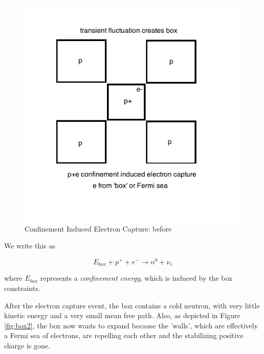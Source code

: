 \documentclass[%
 aip,
 jmp,%
 amsmath,amssymb,
 reprint,%
]{revtex4-1}
\begin{document}
\begin{figure}
   \includegraphics[scale=0.5]{img/box-before.png}
   \caption{Confinement Induced Electron Capture: before}
  \label{fig:box1}
\end{figure}

We write this as

$$E_{box}+p^{+}+e^{-}\rightarrow n^{0}+\nu_{e}$$

where $E_{box}$ represents a \emph{confinement energy}, which is induced by the box constraints. 

After the electron capture event, the box contains a cold neutron, with very little kinetic energy and a very small mean free path.  Also, as depicted in Figure \ref{fig:box2}, the box now wants to expand because the 'walls', which are effectively a Fermi sea of electrons, are repelling each other and the stabilizing positive charge is gone.
\end{document}

